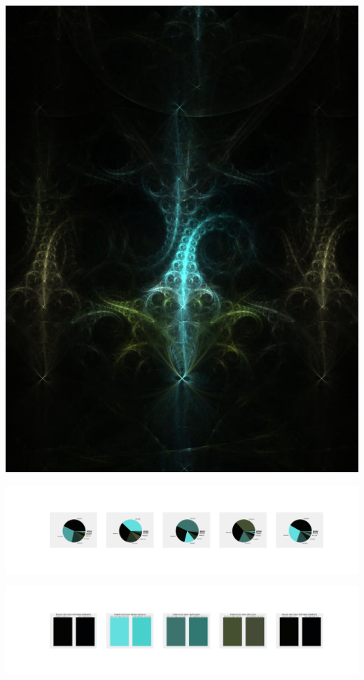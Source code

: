 \documentclass[11pt]{article}
\begin{document}
\begin{landscape}
    \begin{center}
    \includegraphics[width=\textwidth]{./nbimg/file (21).jpg}
    \end{center}

    \begin{center}
    \includegraphics[width=250mm]{./nbimg/pie-123.jpg}
    \end{center}

    \begin{center}
    \includegraphics[width=250mm]{./nbimg/peak-123.jpg}
    \end{center}
    


\end{landscape}
\end{document}
